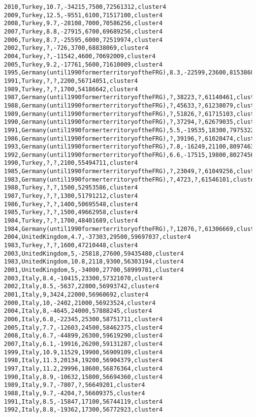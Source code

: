 \begin{lstlisting}[basicstyle=\footnotesize\ttfamily,numbers=none]
2010,Turkey,10.7,-34215,7500,72561312,cluster4
2009,Turkey,12.5,-9551,6100,71517100,cluster4
2008,Turkey,9.7,-28108,7000,70586256,cluster4
2007,Turkey,8.8,-27915,6700,69689256,cluster4
2006,Turkey,8.7,-25595,6000,72519974,cluster4
2002,Turkey,?,-726,3700,68838069,cluster4
2004,Turkey,?,-11542,4600,70692009,cluster4
2005,Turkey,9.2,-17761,5600,71610009,cluster4
1995,Germany(until1990formerterritoryoftheFRG),8.3,-22599,23600,81538603,cluster4
1991,Turkey,?,?,2200,56714051,cluster4
1989,Turkey,?,?,1700,54186642,cluster4
1987,Germany(until1990formerterritoryoftheFRG),?,38223,?,61140461,cluster4
1988,Germany(until1990formerterritoryoftheFRG),?,45633,?,61238079,cluster4
1989,Germany(until1990formerterritoryoftheFRG),?,51826,?,61715103,cluster4
1990,Germany(until1990formerterritoryoftheFRG),?,37294,?,62679035,cluster4
1991,Germany(until1990formerterritoryoftheFRG),5.5,-19535,18300,79753227,cluster4
1986,Germany(until1990formerterritoryoftheFRG),?,39196,?,61020474,cluster4
1993,Germany(until1990formerterritoryoftheFRG),7.8,-16249,21100,80974632,cluster4
1992,Germany(until1990formerterritoryoftheFRG),6.6,-17515,19800,80274564,cluster4
1990,Turkey,?,?,2100,55494711,cluster4
1985,Germany(until1990formerterritoryoftheFRG),?,23049,?,61049256,cluster4
1983,Germany(until1990formerterritoryoftheFRG),?,4723,?,61546101,cluster4
1988,Turkey,?,?,1500,52953586,cluster4
1987,Turkey,?,?,1300,51791212,cluster4
1986,Turkey,?,?,1400,50695548,cluster4
1985,Turkey,?,?,1500,49662958,cluster4
1984,Turkey,?,?,1700,48401689,cluster4
1984,Germany(until1990formerterritoryoftheFRG),?,12076,?,61306669,cluster4
2004,UnitedKingdom,4.7,-37303,29500,59697037,cluster4
1983,Turkey,?,?,1600,47210448,cluster4
2003,UnitedKingdom,5,-25818,27600,59435480,cluster4
1983,UnitedKingdom,10.8,2118,9300,56303194,cluster4
2001,UnitedKingdom,5,-34000,27700,58999781,cluster4
2003,Italy,8.4,-10415,23300,57321070,cluster4
2002,Italy,8.5,-5637,22800,56993742,cluster4
2001,Italy,9,3424,22000,56960692,cluster4
2000,Italy,10,-2402,21000,56923524,cluster4
2004,Italy,8,-4645,24000,57888245,cluster4
2006,Italy,6.8,-22345,25300,58751711,cluster4
2005,Italy,7.7,-12603,24500,58462375,cluster4
2008,Italy,6.7,-44899,26300,59619290,cluster4
2007,Italy,6.1,-19916,26200,59131287,cluster4
1999,Italy,10.9,11529,19900,56909109,cluster4
1998,Italy,11.3,20134,19200,56904379,cluster4
1997,Italy,11.2,29996,18600,56876364,cluster4
1990,Italy,8.9,-10632,15800,56694360,cluster4
1989,Italy,9.7,-7807,?,56649201,cluster4
1988,Italy,9.7,-4204,?,56609375,cluster4
1991,Italy,8.5,-15847,17100,56744119,cluster4
1992,Italy,8.8,-19362,17300,56772923,cluster4

\end{lstlisting}
